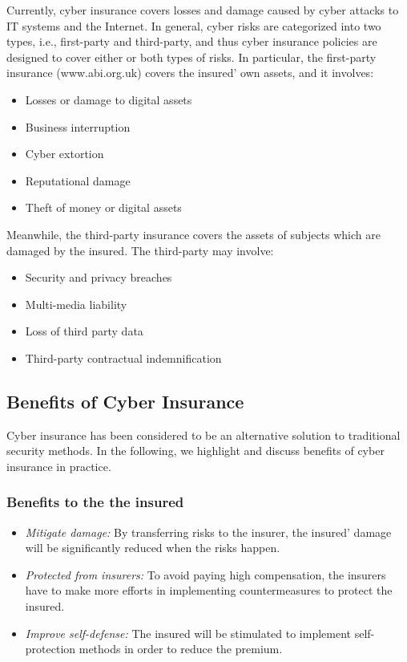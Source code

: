 \documentclass[twocolumn,10pt]{IEEEtran}
\begin{document}
Currently, cyber insurance covers losses and damage caused by cyber attacks to IT systems and the Internet. In general, cyber risks are categorized into two types, i.e., first-party and third-party, and thus cyber insurance policies are designed to cover either or both types of risks. In particular, the first-party insurance (www.abi.org.uk) covers the insured' own assets, and it involves: 
\begin{itemize}
	\item Losses or damage to digital assets
	\item Business interruption
	\item Cyber extortion
	\item Reputational damage 
	\item Theft of money or digital assets
\end{itemize}
Meanwhile, the third-party insurance covers the assets of subjects which are damaged by the insured. The third-party may involve:
\begin{itemize}
	\item Security and privacy breaches
	\item Multi-media liability
	\item Loss of third party data
	\item Third-party contractual indemnification
\end{itemize}



\subsection{Benefits of Cyber Insurance}

Cyber insurance has been considered to be an alternative solution to traditional security methods. In the following, we highlight and discuss benefits of cyber insurance in practice.  

\subsubsection{Benefits to the the insured} 

\begin{itemize}
	\item \emph{Mitigate damage:} By transferring risks to the insurer, the insured' damage will be significantly reduced when the risks happen. 
	\item \emph{Protected from insurers:} To avoid paying high compensation, the insurers have to make more efforts in implementing countermeasures to protect the insured.
	\item \emph{Improve self-defense:} The insured will be stimulated to implement self-protection methods in order to reduce the premium.
\end{itemize}
\end{document}
